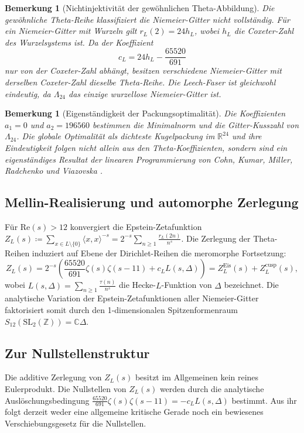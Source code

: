 \documentclass[11pt,a4paper]{article}
\newtheorem{remark}[theorem]{Bemerkung}
\begin{document}
	\begin{remark}[Nichtinjektivität der gewöhnlichen Theta-Abbildung]
		Die gewöhnliche Theta-Reihe klassifiziert die Niemeier-Gitter nicht vollständig. Für ein Niemeier-Gitter mit Wurzeln gilt $r_L(2) = 24 h_L$, wobei $h_L$ die Coxeter-Zahl des Wurzelsystems ist. Da der Koeffizient
		\begin{equation}
			c_L = 24 h_L - \frac{65520}{691}
		\end{equation}
		nur von der Coxeter-Zahl abhängt, besitzen verschiedene Niemeier-Gitter mit derselben Coxeter-Zahl dieselbe Theta-Reihe. Die Leech-Faser ist gleichwohl eindeutig, da $\Lambda_{24}$ das einzige wurzellose Niemeier-Gitter ist.
	\end{remark}
	
	\begin{remark}[Eigenständigkeit der Packungsoptimalität]
		Die Koeffizienten $a_1=0$ und $a_2=196560$ bestimmen die Minimalnorm und die Gitter-Kusszahl von $\Lambda_{24}$. Die globale Optimalität als dichteste Kugelpackung im $\mathbb{R}^{24}$ und ihre Eindeutigkeit folgen nicht allein aus den Theta-Koeffizienten, sondern sind ein eigenständiges Resultat der linearen Programmierung von Cohn, Kumar, Miller, Radchenko und Viazovska \cite{cohn}.
	\end{remark}
	
	\subsection{Mellin-Realisierung und automorphe Zerlegung}
	
	Für $\mathrm{Re}(s)>12$ konvergiert die Epstein-Zetafunktion $Z_L(s) \coloneqq \sum_{x\in L\setminus\{0\}} \langle x,x\rangle^{-s} = 2^{-s} \sum_{n\geq 1} \frac{r_L(2n)}{n^s}$. Die Zerlegung der Theta-Reihen induziert auf Ebene der Dirichlet-Reihen die meromorphe Fortsetzung:
	\begin{equation}
		Z_L(s) = 2^{-s} \left( \frac{65520}{691} \zeta(s)\zeta(s-11) + c_L L(s,\Delta) \right) = Z_L^{\mathrm{Eis}}(s) + Z_L^{\mathrm{cusp}}(s),
	\end{equation}
	wobei $L(s,\Delta) = \sum_{n\geq 1} \frac{\tau(n)}{n^s}$ die Hecke-$L$-Funktion von $\Delta$ bezeichnet. Die analytische Variation der Epstein-Zetafunktionen aller Niemeier-Gitter faktorisiert somit durch den 1-dimensionalen Spitzenformenraum $S_{12}(\mathrm{SL}_2(\mathbb{Z})) = \mathbb{C}\Delta$.
	
	\subsection{Zur Nullstellenstruktur}
	Die additive Zerlegung von $Z_L(s)$ besitzt im Allgemeinen kein reines Eulerprodukt. Die Nullstellen von $Z_L(s)$ werden durch die analytische Auslöschungsbedingung $\frac{65520}{691}\zeta(s)\zeta(s-11) = -c_L L(s,\Delta)$ bestimmt. Aus ihr folgt derzeit weder eine allgemeine kritische Gerade noch ein bewiesenes Verschiebungsgesetz für die Nullstellen.
	
\end{document}
